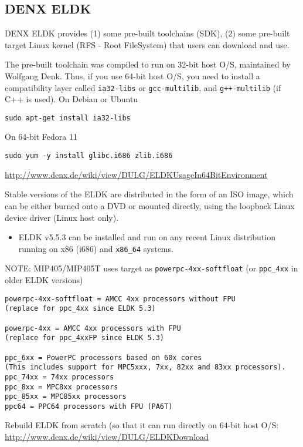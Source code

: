 \subsection{DENX ELDK}
\label{sec:ELDK}

DENX ELDK provides (1) some pre-built toolchains (SDK), (2) some pre-built 
target Linux kernel (RFS - Root FileSystem) that users can download and use. 

The pre-built toolchain was compiled to run on 32-bit host O/S, maintained by
Wolfgang Denk. Thus, if you use 64-bit host O/S, you need to install a compatibility layer
called \verb!ia32-libs! or \verb!gcc-multilib!, and \verb!g++-multilib! (if C++
is used). On Debian or Ubuntu
\begin{verbatim}
sudo apt-get install ia32-libs
\end{verbatim}
On 64-bit Fedora 11
\begin{verbatim}
sudo yum -y install glibc.i686 zlib.i686
\end{verbatim}
\url{http://www.denx.de/wiki/view/DULG/ELDKUsageIn64BitEnvironment}

Stable versions of the ELDK are distributed in the form of an ISO image, which
can be either burned onto a DVD or mounted directly, using the loopback Linux
device driver (Linux host only).

\begin{itemize}
  \item ELDK v5.5.3 can be installed and run on any recent Linux distribution
  running on x86 (i686) and \verb!x86_64! systems.
 
\end{itemize}


NOTE: MIP405/MIP405T uses target as \verb!powerpc-4xx-softfloat! (or
\verb!ppc_4xx! in older ELDK versions)
\begin{verbatim}
powerpc-4xx-softfloat = AMCC 4xx processors without FPU
(replace for ppc_4xx since ELDK 5.3)
 
powerpc-4xx = AMCC 4xx processors with FPU
(replace for ppc_4xxFP since ELDK 5.3)

ppc_6xx = PowerPC processors based on 60x cores 
(This includes support for MPC5xxx, 7xx, 82xx and 83xx processors).
ppc_74xx = 74xx processors
ppc_8xx = MPC8xx processors
ppc_85xx = MPC85xx processors
ppc64 = PPC64 processors with FPU (PA6T)
\end{verbatim}

Rebuild ELDK from scratch (so that it can run directly on 64-bit host O/S:
\url{http://www.denx.de/wiki/view/DULG/ELDKDownload}

